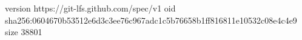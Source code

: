 version https://git-lfs.github.com/spec/v1
oid sha256:0604670b53512e6d3c3ee76c967adc1c5b76658b1ff816811e10532c08e4c4e9
size 38801
